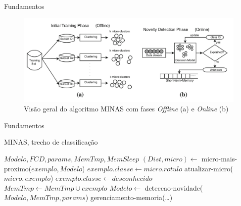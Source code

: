 \documentclass[aspectratio=43,10pt]{beamer}
\newcommand{\nota}[1]{\hspace*{-0.5cm}\textit{{\color[rgb]{1,0,0}Nota: #1}}}
\begin{document}
\begin{frame}[fragile]{Fundamentos}
  \begin{figure}[ht]
    \centering
    \includegraphics[width=\textwidth]{figuras/FariaMinas2015-fases.png}
    \caption{Visão geral do algoritmo MINAS com fases \emph{Offline} (a) e 
    \emph{Online} (b) \cite{Faria2015minas}}
    \label{fig:minas}
  \end{figure}
\end{frame}

\begin{frame}[fragile]{Fundamentos}
  \begin{algorithm}[H]
    \caption{MINAS, trecho de classificação}
    \label{alg:MINAS}
    \renewcommand{\algorithmicrequire}{\textbf{Entrada:}}
    \begin{algorithmic}[1]
      \REQUIRE $Modelo,FCD,params,MemTmp,MemSleep$
      \STATE $(Dist,micro) \leftarrow$ micro-mais-proximo($exemplo,Modelo$)
      \STATE $exemplo.classe \leftarrow micro.rotulo$
      \STATE atualizar-micro($micro,exemplo$)
      \ELSE
      \STATE $exemplo.classe \leftarrow desconhecido$
      \STATE $MemTmp \leftarrow MemTmp \cup exemplo$
      \STATE $Modelo \leftarrow $ deteccao-novidade($Modelo,MemTmp,params$)
      \ENDIF
      \ENDIF
      \STATE gerenciamento-memoria(\dots)
      \ENDFOR
    \end{algorithmic}
  \end{algorithm}
\end{frame}
\end{document}
